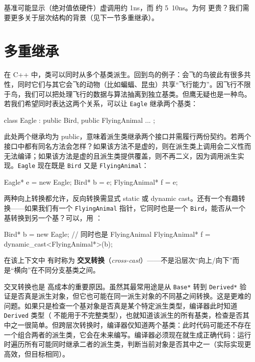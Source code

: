 基准可能显示（绝对值依硬件）虚调用约 1ns，而  约 5~10ns。为何  更贵？我们需要更多关于层次结构的背景（见下一节多重继承）。

\section{多重继承}

在 C++ 中，类可以同时从多个基类派生。回到鸟的例子：会飞的鸟彼此有很多共性，同时它们与其它会飞的动物（比如蝙蝠、昆虫）共享“飞行能力”。因飞行不限于鸟，我们可以把处理飞行的数据与算法抽离到独立基类。但鹰无疑也是一种鸟。若我们希望同时表达这两个关系，可以让 \texttt{Eagle} 继承两个基类：

\begin{code}
class Eagle : public Bird, public FlyingAnimal { ... };
\end{code}

此处两个继承均为 public，意味着派生类继承两个接口并需履行两份契约。若两个接口中都有同名方法会怎样？如果该方法不是虚的，则在派生类上调用会二义性而无法编译；如果该方法是虚的且派生类提供覆盖，则不再二义，因为调用派生实现。\texttt{Eagle} 现在既是 \texttt{Bird} 又是 \texttt{FlyingAnimal}：

\begin{code}
Eagle* e = new Eagle;
Bird* b = e;
FlyingAnimal* f = e;
\end{code}

两种向上转换都允许，反向转换需显式 static 或 dynamic cast。还有一个有趣转换——如果我们有一个 \texttt{FlyingAnimal} 指针，它同时也是一个 \texttt{Bird}，能否从一个基转换到另一个基？可以，用 ：

\begin{code}
Bird* b = new Eagle;   // 同时也是 FlyingAnimal
FlyingAnimal* f = dynamic_cast<FlyingAnimal*>(b);
\end{code}

在该上下文中 有时称为 \textbf{交叉转换}（\emph{cross-cast}）——不是沿层次“向上/向下”而是“横向”在不同分支基类之间。

交叉转换也是 高成本的重要原因。虽然其最常用途是从 \texttt{Base*} 转到 \texttt{Derived*} 验证是否真是派生对象，但它也可能在同一派生对象的不同基之间转换。这是更难的问题。如果只是检查一个基对象是否真是某个特定派生类型，编译器此时知道 \texttt{Derived} 类型（ 不能用于不完整类型），也就知道该派生的所有基类，检查是否其中之一很简单。但跨层次转换时，编译器仅知道两个基类：此时代码可能还不存在一个组合两者的派生类，它会在未来编写。编译器必须现在就生成正确代码：运行时遍历所有可能同时继承二者的派生类，判断当前对象是否其中之一（实际实现更高效，但目标相同）。

